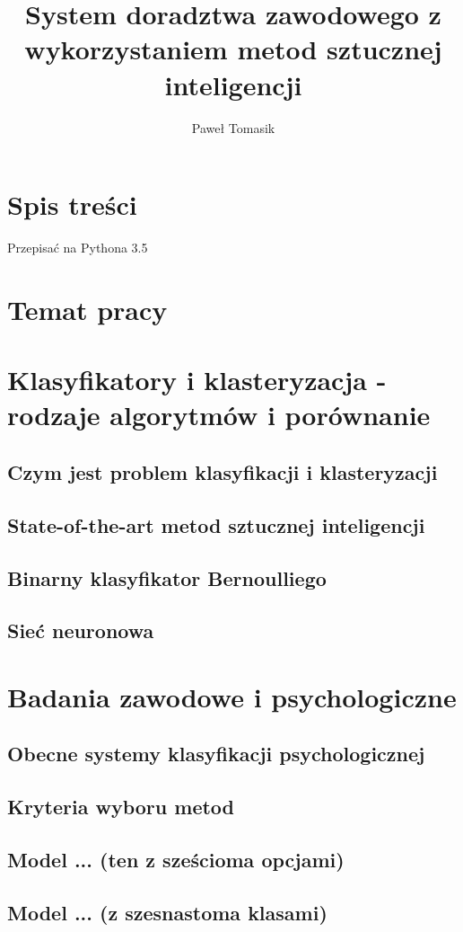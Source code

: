 \documentclass[11pt]{article} %
\title{System doradztwa zawodowego z wykorzystaniem metod sztucznej inteligencji}
\author{Paweł Tomasik}
\begin{document}
\maketitle

\section{Spis treści}
Przepisać na Pythona 3.5
\section{Temat pracy}

\section{Klasyfikatory i klasteryzacja - rodzaje algorytmów i porównanie}
\subsection{Czym jest problem klasyfikacji i klasteryzacji}
\subsection{State-of-the-art metod sztucznej inteligencji}
\subsection{Binarny klasyfikator Bernoulliego}
\subsection{Sieć neuronowa}
\section{Badania zawodowe i psychologiczne}
\subsection{Obecne systemy klasyfikacji psychologicznej}
\subsection{Kryteria wyboru metod}
\subsection{Model ... (ten z sześcioma opcjami)}
\subsection{Model ... (z szesnastoma klasami)}
\end{document}
